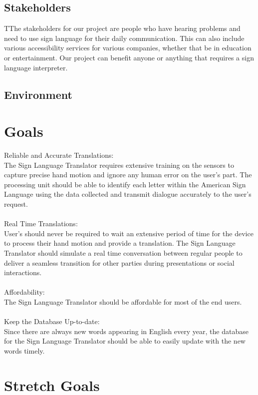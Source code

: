\documentclass{article}
\begin{document}
\subsection{Stakeholders}
TThe stakeholders for our project are people who have hearing problems and need to use sign language for their daily communication. This can also include various accessibility services for various companies, whether that be in education or entertainment. Our project can benefit anyone or anything that requires a sign language interpreter.
\subsection{Environment}


\section{Goals}

Reliable and Accurate Translations:\\
The Sign Language Translator requires extensive training on the sensors to capture precise hand motion and ignore any human error on the user’s part. The processing unit should be able to identify each letter within the American Sign Language using the data collected and transmit dialogue accurately to the user’s request.\\
\\Real Time Translations:\\
User’s should never be required to wait an extensive period of time for the device to process their hand motion and provide a translation. The Sign Language Translator should simulate a real time conversation between regular people to deliver a seamless transition for other parties during presentations or social interactions.
\\
\\Affordability:\\
The Sign Language Translator should be affordable for most of the end users. 
\\
\\Keep the Database Up-to-date:\\
Since there are always new words appearing in English every year, the database for the Sign Language Translator should be able to easily update with the new words timely.



\section{Stretch Goals}
\end{document}
